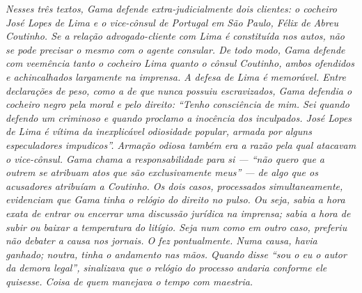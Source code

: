 {\begin{didas}
\emph{Nesses três textos, Gama defende extra-judicialmente dois
clientes: o cocheiro José Lopes de Lima e o vice-cônsul de Portugal em
São Paulo, Félix de Abreu Coutinho. Se a relação advogado-cliente com
Lima é constituída nos autos, não se pode precisar o mesmo com o agente
consular. De todo modo, Gama defende com veemência tanto o cocheiro Lima
quanto o cônsul Coutinho, ambos ofendidos e achincalhados largamente na
imprensa. A defesa de Lima é memorável. Entre declarações de peso, como
a de que nunca possuiu escravizados, Gama defendia o cocheiro negro pela
moral e pelo direito: ``Tenho consciência de mim. Sei quando defendo um
criminoso e quando proclamo a inocência dos inculpados. José Lopes de
Lima é vítima da inexplicável odiosidade popular, armada por alguns
especuladores impudicos''. Armação odiosa também era a razão pela qual
atacavam o vice-cônsul. Gama chama a responsabilidade para si --- ``não
quero que a outrem se atribuam atos que são exclusivamente meus'' --- de
algo que os acusadores atribuíam a Coutinho. Os dois casos, processados
simultaneamente, evidenciam que Gama tinha o relógio do direito no
pulso. Ou seja, sabia a hora exata de entrar ou encerrar uma discussão
jurídica na imprensa; sabia a hora de subir ou baixar a temperatura do
litígio. Seja num como em outro caso, preferiu não debater a causa nos
jornais. O fez pontualmente. Numa causa, havia ganhado; noutra, tinha o
andamento nas mãos. Quando disse ``sou o eu o autor da demora legal'',
sinalizava que o relógio do processo andaria conforme ele quisesse.
Coisa de quem manejava o tempo com maestria. }
\end{didas}


}
